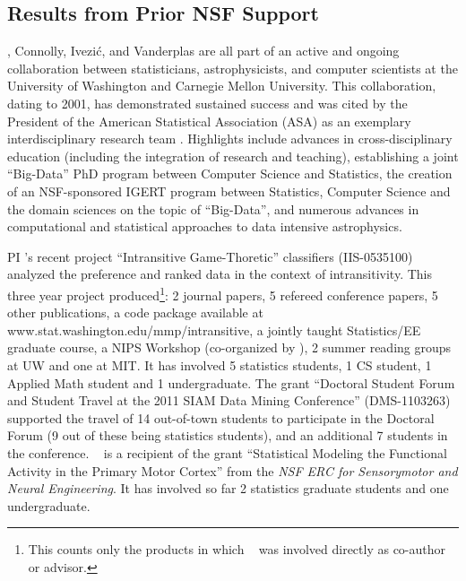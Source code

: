 \subsection{             Results from Prior NSF Support             }
\label{sec:priorNSF}

\meila, Connolly, Ivezi\'{c}, and Vanderplas are all part of an active
and ongoing collaboration between statisticians, astrophysicists, and
computer scientists at the University of Washington and Carnegie
Mellon University.  This collaboration, dating to 2001, has
demonstrated sustained success and was cited by the President of the
American Statistical Association (ASA) as an exemplary
interdisciplinary research team \cite{straf03}. Highlights
include advances in cross-disciplinary education
(including the integration of research and teaching), establishing a
joint ``Big-Data'' PhD program between Computer Science and
Statistics, the creation of an NSF-sponsored IGERT program between
Statistics, Computer Science and the domain sciences on the topic of
``Big-Data'', and numerous advances in computational and statistical
approaches to data intensive astrophysics.

PI \meila's recent project ``Intransitive Game-Thoretic'' classifiers
(IIS-0535100) analyzed the preference and ranked data in the context
of intransitivity. This three year project produced\footnote{This
  counts only the products in which \meila~ was involved directly as
  co-author or advisor.}: 2 journal papers, 5 refereed conference
papers, 5 other publications, a code package available at
{www.stat.washington.edu/mmp/intransitive}, a jointly taught
Statistics/EE graduate course, a NIPS Workshop (co-organized by
\meila), 2 summer reading groups at UW and one at MIT. It has involved
5 statistics students, 1 CS student, 1 Applied Math student and 1
undergraduate. The grant ``Doctoral Student Forum and Student Travel
at the 2011 SIAM Data Mining Conference'' (DMS-1103263) supported the
travel of 14 out-of-town students to participate in the Doctoral Forum
(9 out of these being statistics students), and an additional 7
students in the conference. 
\meila~ is a recipient of the grant ``Statistical Modeling the
Functional Activity in the Primary Motor Cortex'' from the {\em NSF
  ERC for Sensorymotor and Neural Engineering}. It has involved so far 2 statistics graduate students and one
undergraduate.

